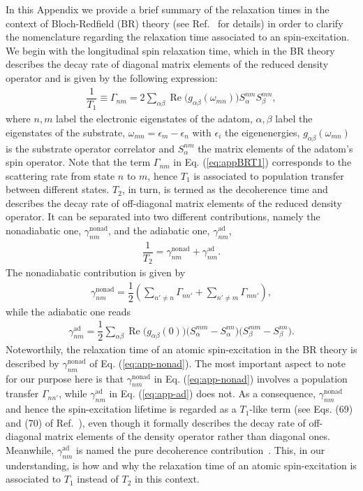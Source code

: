 \documentclass[prb,footinbib,showpacs,twocolumn,amsmath,amssymb]{revtex4}
\renewcommand\Re{\operatorname{Re}}
\newcommand{\bek}{\begin{eqnarray}}
\newcommand{\ek}{\end{eqnarray}}
\begin{document}
In this Appendix we provide a brief summary of the 
relaxation times in the context of Bloch-Redfield (BR) theory 
(see Ref.~ for 
details) in order to clarify the nomenclature regarding the 
relaxation time associated to an spin-excitation.
We begin with the longitudinal spin relaxation time, which in 
the BR theory describes the
decay rate of diagonal matrix elements of the reduced density operator and
is given by the following expression:
\bek\label{eq:appBRT1}
\dfrac{1}{T_{1}}\equiv \Gamma_{nm}=2\sum_{\alpha\beta}\Re\big(g_{\alpha\beta}(\omega_{mn})\big)
S_{\alpha}^{nm}S_{\beta}^{mn},
\ek
where $n,m$ label  the  electronic eigenstates of the adatom, $\alpha,\beta$ label the eigenstates of the substrate,
$\omega_{mn}=\epsilon_m - \epsilon_n$ with $\epsilon_i$ the eigenenergies,  
$g_{\alpha\beta}(\omega_{mn})$ is the substrate operator correlator and $S_{\alpha}^{nm}$
the matrix elements of the adatom's spin operator. 
Note that the term $\Gamma_{nm}$ in Eq. (\ref{eq:appBRT1}) corresponds to the scattering rate from state $n$ to $m$, hence
$T_{1}$ is associated to population transfer between different states. 
$T_{2}$, in turn, is termed as the decoherence time and describes the
decay rate of off-diagonal matrix elements of the reduced density operator. 
It can be separated into two different contributions,
namely the nonadiabatic one, $\gamma^{\text{nonad}}_{nm}$, and the adiabatic one, $\gamma^{\text{ad}}_{nm}$,
\bek\label{eq:appBRT2}
\dfrac{1}{T_{2}}=\gamma^{\text{nonad}}_{nm}+\gamma^{\text{ad}}_{nm}.
\ek
The nonadiabatic contribution is given by 
\bek\label{eq:app-nonad}
\gamma^{\text{nonad}}_{nm}=\dfrac{1}{2}\left(
\sum_{n'\neq n}\Gamma_{nn'}+\sum_{n'\neq m}\Gamma_{mn'}
\right),
\ek
while the adiabatic one reads
\bek\label{eq:app-ad}
\gamma^{\text{ad}}_{nm}=\dfrac{1}{2}\sum_{\alpha\beta}\Re\big(g_{\alpha\beta}(0)\big)
\Big( S_{\alpha}^{mm}-S_{\alpha}^{nn} \Big)\Big( S_{\beta}^{mm}-S_{\beta}^{nn} \Big).
\ek
Noteworthily, the relaxation time of an atomic spin-excitation in the BR theory 
is described by $\gamma^{\text{nonad}}_{nm}$ of Eq. (\ref{eq:app-nonad}). 
The most important aspect to note for our purpose here
is that $\gamma^{\text{nonad}}_{nm}$ in Eq. (\ref{eq:app-nonad})
involves a population transfer $\Gamma_{nn'}$, while 
$\gamma^{\text{ad}}_{nm}$ in Eq. (\ref{eq:app-ad}) does not. 
As a consequence, $\gamma^{\text{nonad}}_{nm}$ and hence the spin-excitation lifetime
is regarded as a $T_{1}$-like term 
(see Eqs. (69) and (70) of Ref.~), 
even though it formally describes the decay rate of off-diagonal matrix elements of
the density operator rather than diagonal ones.
Meanwhile,  $\gamma^{\text{ad}}_{nm}$ is named  
the pure decoherence contribution~\cite{delgado_spin_2017}. 
This, in our understanding, is how and why 
the relaxation time of an atomic spin-excitation is 
associated to $T_{1}$ instead of $T_{2}$
in this context. 
\end{document}
